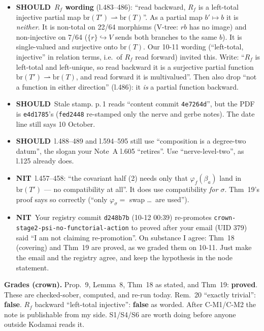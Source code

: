\documentclass[10pt]{article}
\newcommand{\SH}{\textbf{SHOULD}}
\newcommand{\NI}{\textbf{NIT}}
\newcommand{\br}{\mathrm{br}}
\begin{document}
\begin{itemize}
\item[\textbf{C-S1}] \SH\ \textbf{$R_f$ wording} (l.483--486): ``read backward, $R_f$ is a left-total injective partial
map $\br(T')\rightharpoonup\br(T)$''. As a partial map $b'\mapsto b$ it is \emph{neither}. It is non-total on 22/64
morphisms (V-tree: $rb$ has no image) and non-injective on 7/64 ($\{r\}\hookrightarrow V$ sends both branches to the
same $b$). It is single-valued and surjective onto $\br(T)$. Our 10-11 wording (``left-total, injective'' in
relation terms, i.e.\ of $R_f$ read forward) invited this. Write: ``$R_f$ is left-total and left-unique, so read
backward it is a surjective partial function $\br(T')\rightharpoonup\br(T)$, and read forward it is multivalued''.
Then also drop ``not a function in either direction'' (l.486): it \emph{is} a partial function backward.
\item[\textbf{C-S2}] \SH\ Stale stamp. p.\,1 reads ``content commit \texttt{4e7264d}'', but the PDF is \texttt{e4d1785}'s
(\texttt{fed2448} re-stamped only the nerve and gerbe notes). The date line still says 10 October.
\item[\textbf{C-S3}] \SH\ l.488--489 and l.594--595 still use ``composition is a degree-two datum'', the slogan your Note~A
l.605 ``retires''. Use ``nerve-level-two'', as l.125 already does.
\item[\textbf{C-N1}] \NI\ l.457--458: ``the covariant half (2) needs only that $\varphi_f(\beta_a)$ land in $\br(T')$ ---
no compatibility at all''. It does use compatibility \emph{for $\sigma$}. Thm~19's proof says so correctly (``only
$\varphi_\sigma=$ swap \dots\ are used'').
\item[\textbf{C-N2}] \NI\ Your registry commit \texttt{d248b7b} (10-12 00:39) re-promotes
\texttt{crown-stage2-psi-no-functorial-action} to proved after your email (UID 379) said ``I am not claiming
re-promotion''. On substance I agree: Thm~18 (covering) and Thm~19 are proved, as we graded them on 10-11. Just
make the email and the registry agree, and keep the hypothesis in the node statement.
\end{itemize}
\textbf{Grades (crown).} Prop.~9, Lemma~8, Thm~18 as stated, and Thm~19: \textbf{proved}. These are checked-sober,
computed, and re-run today. Rem.~20 ``exactly trivial'': \textbf{false}. $R_f$ backward ``left-total injective'':
\textbf{false} as worded. After C-M1/C-M2 the note is publishable from my side. S1/S4/S6 are worth doing before
anyone outside Kodamai reads it.
\end{document}
